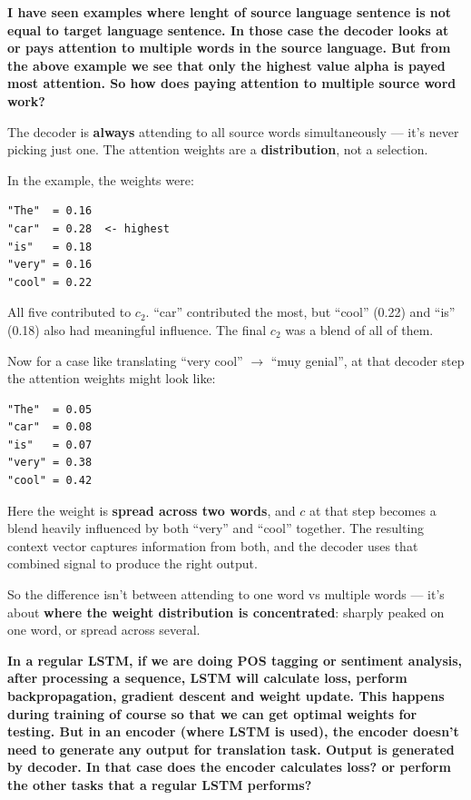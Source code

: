 \bigskip

\textbf{I have seen examples where lenght of source language sentence is not equal to target language sentence. In those case the decoder looks at or pays attention to multiple words in the source language. But from the above example we see that only the highest value alpha is payed most attention. So how does paying attention to multiple source word work?}

The decoder is \textbf{always} attending to all source words simultaneously --- it's never picking just one. The attention weights are a \textbf{distribution}, not a selection.

In the example, the weights were:

\begin{verbatim}
"The"  = 0.16
"car"  = 0.28  <- highest
"is"   = 0.18
"very" = 0.16
"cool" = 0.22
\end{verbatim}

All five contributed to $c_2$. ``car'' contributed the most, but ``cool'' (0.22) and ``is'' (0.18) also had meaningful influence. The final $c_2$ was a blend of all of them.

Now for a case like translating ``very cool'' $\rightarrow$ ``muy genial'', at that decoder step the attention weights might look like:

\begin{verbatim}
"The"  = 0.05
"car"  = 0.08
"is"   = 0.07
"very" = 0.38
"cool" = 0.42
\end{verbatim}

Here the weight is \textbf{spread across two words}, and $c$ at that step becomes a blend heavily influenced by both ``very'' and ``cool'' together. The resulting context vector captures information from both, and the decoder uses that combined signal to produce the right output.

So the difference isn't between attending to one word vs multiple words --- it's about \textbf{where the weight distribution is concentrated}: sharply peaked on one word, or spread across several.

\bigskip

\textbf{In a regular LSTM, if we are doing POS tagging or sentiment analysis, after processing a sequence, LSTM will calculate loss, perform backpropagation, gradient descent and weight update. This happens during training of course so that we can get optimal weights for testing. But in an encoder (where LSTM is used), the encoder doesn't need to generate any output for translation task. Output is generated by decoder. In that case does the encoder calculates loss? or perform the other tasks that a regular LSTM performs?}

